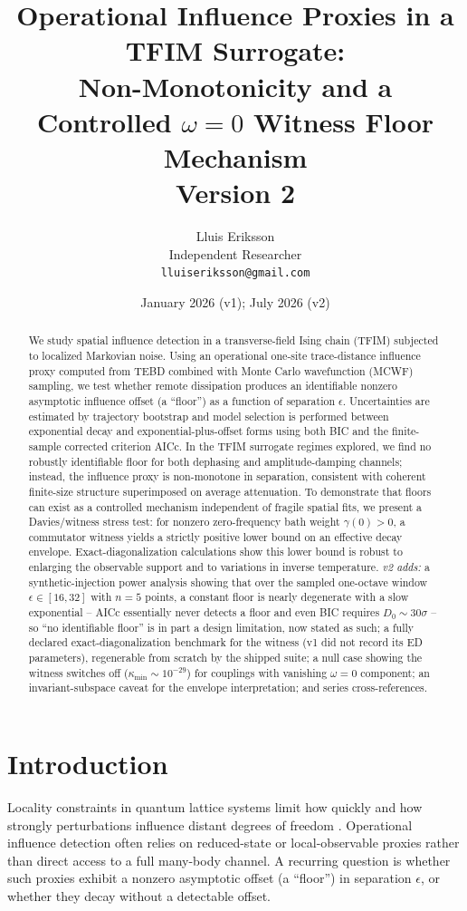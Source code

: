 \documentclass[11pt]{article}
\title{Operational Influence Proxies in a TFIM Surrogate:\\
Non-Monotonicity and a Controlled $\omega = 0$ Witness Floor Mechanism\\
{\normalsize Version 2}}
\author{Lluis Eriksson\\ Independent Researcher\\ \texttt{lluiseriksson@gmail.com}}
\date{January 2026 (v1); July 2026 (v2)}
\begin{document}
\maketitle

\begin{abstract}
We study spatial influence detection in a transverse-field Ising chain
(TFIM) subjected to localized Markovian noise. Using an operational
one-site trace-distance influence proxy computed from TEBD combined with
Monte Carlo wavefunction (MCWF) sampling, we test whether remote
dissipation produces an identifiable nonzero asymptotic influence offset
(a ``floor'') as a function of separation $\epsilon$. Uncertainties are
estimated by trajectory bootstrap and model selection is performed between
exponential decay and exponential-plus-offset forms using both BIC and the
finite-sample corrected criterion AICc. In the TFIM surrogate regimes
explored, we find no robustly identifiable floor for both dephasing and
amplitude-damping channels; instead, the influence proxy is non-monotone
in separation, consistent with coherent finite-size structure superimposed
on average attenuation. To demonstrate that floors can exist as a
controlled mechanism independent of fragile spatial fits, we present a
Davies/witness stress test: for nonzero zero-frequency bath weight
$\gamma(0) > 0$, a commutator witness yields a strictly positive lower
bound on an effective decay envelope. Exact-diagonalization calculations
show this lower bound is robust to enlarging the observable support and to
variations in inverse temperature. \emph{v2 adds:} a synthetic-injection
power analysis showing that over the sampled one-octave window
$\epsilon \in [16, 32]$ with $n = 5$ points, a constant floor is nearly
degenerate with a slow exponential -- AICc essentially never detects a
floor and even BIC requires $D_0 \sim 30\sigma$ -- so ``no identifiable
floor'' is in part a design limitation, now stated as such; a fully
declared exact-diagonalization benchmark for the witness (v1 did not
record its ED parameters), regenerable from scratch by the shipped suite;
a null case showing the witness switches off ($\kappa_{\min} \sim
10^{-29}$) for couplings with vanishing $\omega = 0$ component;
an invariant-subspace caveat for the envelope interpretation; and series
cross-references.
\end{abstract}

\section{Introduction}
Locality constraints in quantum lattice systems limit how quickly and how
strongly perturbations influence distant degrees of freedom \cite{LR}.
Operational influence detection often relies on reduced-state or
local-observable proxies rather than direct access to a full many-body
channel. A recurring question is whether such proxies exhibit a nonzero
asymptotic offset (a ``floor'') in separation $\epsilon$, or whether they
decay without a detectable offset.
\end{document}
